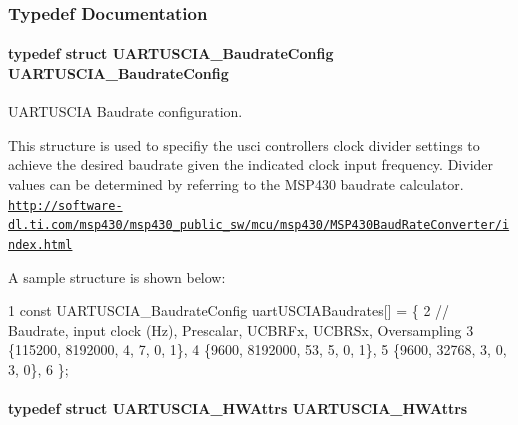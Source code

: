 \subsubsection{Typedef Documentation}
\paragraph[{U\+A\+R\+T\+U\+S\+C\+I\+A\+\_\+\+Baudrate\+Config}]{\setlength{\rightskip}{0pt plus 5cm}typedef struct {\bf U\+A\+R\+T\+U\+S\+C\+I\+A\+\_\+\+Baudrate\+Config}  {\bf U\+A\+R\+T\+U\+S\+C\+I\+A\+\_\+\+Baudrate\+Config}}\label{_u_a_r_t_u_s_c_i_a_8h_a9dd05c71b8c01f08e0e7a3d244b979a5}


U\+A\+R\+T\+U\+S\+C\+I\+A Baudrate configuration. 

This structure is used to specifiy the usci controller\textquotesingle{}s clock divider settings to achieve the desired baudrate given the indicated clock input frequency. Divider values can be determined by referring to the M\+S\+P430 baudrate calculator. \href{http://software-dl.ti.com/msp430/msp430_public_sw/mcu/msp430/MSP430BaudRateConverter/index.html}{\tt http\+://software-\/dl.\+ti.\+com/msp430/msp430\+\_\+public\+\_\+sw/mcu/msp430/\+M\+S\+P430\+Baud\+Rate\+Converter/index.\+html}

A sample structure is shown below\+: 
\begin{DoxyCode}
1 const UARTUSCIA\_BaudrateConfig uartUSCIABaudrates[] = \{
2  // Baudrate, input clock (Hz), Prescalar, UCBRFx, UCBRSx, Oversampling
3     \{115200,  8192000,          4,         7,      0,      1\},
4     \{9600,    8192000,          53,        5,      0,      1\},
5     \{9600,    32768,            3,         0,      3,      0\},
6 \};
\end{DoxyCode}
\paragraph[{U\+A\+R\+T\+U\+S\+C\+I\+A\+\_\+\+H\+W\+Attrs}]{\setlength{\rightskip}{0pt plus 5cm}typedef struct {\bf U\+A\+R\+T\+U\+S\+C\+I\+A\+\_\+\+H\+W\+Attrs}  {\bf U\+A\+R\+T\+U\+S\+C\+I\+A\+\_\+\+H\+W\+Attrs}}\label{_u_a_r_t_u_s_c_i_a_8h_ae0df79ea0be8c2a982879d4ca96640b6}


